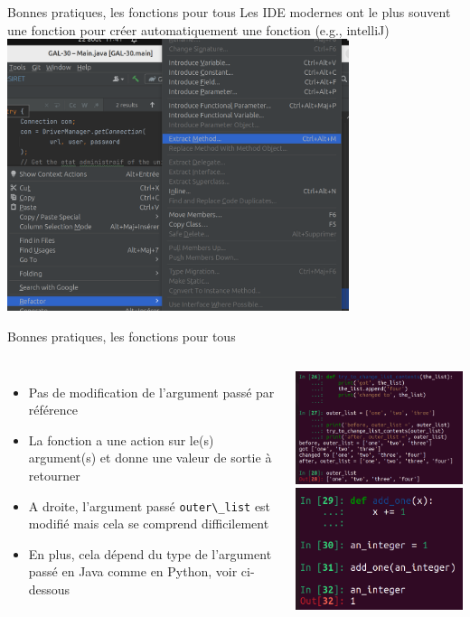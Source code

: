 \documentclass{beamer}
\begin{document}
    \begin{frame}{Bonnes pratiques, les fonctions pour tous}
        Les IDE modernes ont le plus souvent une fonction pour créer automatiquement une fonction (e.g., intelliJ)
        \centering
        \includegraphics[width=10cm]{image/ide-gen-function}
    \end{frame}

    \begin{frame}{Bonnes pratiques, les fonctions pour tous}
        \begin{columns}
            \begin{itemize}

                \item Pas de modification de l'argument passé par référence
                \item La fonction a une action sur le(s) argument(s) et donne une valeur de sortie à retourner
                \item A droite, l'argument passé \lstinline{outer\_list} est modifié mais cela se comprend difficilement
                \item En plus, cela dépend du type de l'argument passé en Java comme en Python, voir ci-dessous

            \end{itemize}
            \centering
            \includegraphics[width=5cm]{image/arg-modified-by-reference}
            \includegraphics[width=5cm]{image/arg-not-modified}
        \end{columns}
    \end{frame}
\end{document}
